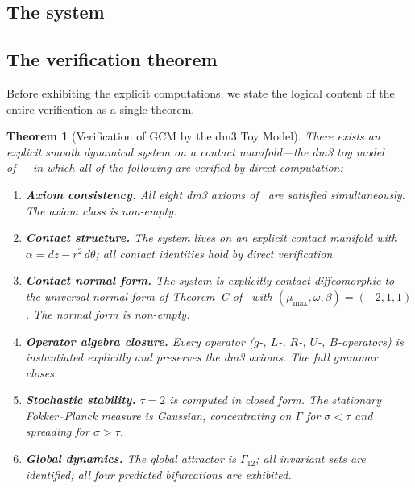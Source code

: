 \documentclass[12pt]{article}
\numberwithin{equation}{section}
\newtheorem{theorem}{Theorem}[section]
\theoremstyle{remark}
\newcommand{\Orb}{\Gamma}
\begin{document}
\subsection{The system}

\subsection{The verification theorem}
\label{subsec:verification-theorem}

Before exhibiting the explicit computations, we state the logical
content of the entire verification as a single theorem.

\begin{theorem}[Verification of GCM by the dm3 Toy Model]
\label{thm:verification}
There exists an explicit smooth dynamical system on a contact
manifold---the dm3 toy model of~\cite{Paper2}---in which all of
the following are verified by direct computation:
\begin{enumerate}[label=\textup{(\arabic*)}]
  \item \textbf{Axiom consistency.} All eight dm3 axioms
        of~\cite{Paper1} are satisfied simultaneously.
        The axiom class is non-empty.
  \item \textbf{Contact structure.} The system lives on an explicit
        contact manifold with $\alpha=dz-r^2\,d\theta$; all contact
        identities hold by direct verification.
  \item \textbf{Contact normal form.} The system is explicitly
        contact-diffeomorphic to the universal normal form of
        Theorem~C of~\cite{Paper1} with $(\mu_{\max},\omega,\beta)=(-2,1,1)$.
        The normal form is non-empty.
  \item \textbf{Operator algebra closure.} Every operator ($g$-,
        $L$-, $R$-, $U$-, $B$-operators) is instantiated explicitly
        and preserves the dm3 axioms. The full grammar closes.
  \item \textbf{Stochastic stability.} $\tau=2$ is computed in
        closed form. The stationary Fokker--Planck measure is
        Gaussian, concentrating on $\Orb$ for $\sigma<\tau$ and
        spreading for $\sigma>\tau$.
  \item \textbf{Global dynamics.} The global attractor is $\Orb_{12}$;
        all invariant sets are identified; all four predicted
        bifurcations are exhibited.
\end{enumerate}
\end{theorem}
\end{document}
